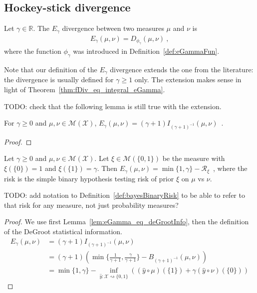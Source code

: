 \subsection{Hockey-stick divergence}

\begin{definition}
  \label{def:eGamma}
  Let $\gamma \in \mathbb{R}$. The $E_\gamma$ divergence between two measures $\mu$ and $\nu$ is
  \begin{align*}
  E_\gamma(\mu, \nu) = D_{\phi_\gamma}(\mu, \nu) \: ,
  \end{align*}
  where the function $\phi_\gamma$ was introduced in Definition~\ref{def:eGammaFun}.
\end{definition}

Note that our definition of the $E_\gamma$ divergence extends the one from the literature: the divergence is usually defined for $\gamma \ge 1$ only.
The extension makes sense in light of Theorem~\ref{thm:fDiv_eq_integral_eGamma}.

TODO: check that the following lemma is still true with the extension.

\begin{lemma}
  \label{lem:eGamma_eq_deGrootInfo}
  For $\gamma \ge 0$ and $\mu, \nu \in \mathcal M(\mathcal X)$, $E_\gamma(\mu, \nu) = (\gamma + 1) I_{(\gamma + 1)^{-1}}(\mu, \nu)$~.
\end{lemma}

\begin{proof}%
\uses{}

\end{proof}

\begin{lemma}
  \label{lem:eGamma_eq_sub_bayesBinaryRisk}
  Let $\gamma \ge 0$ and $\mu, \nu \in \mathcal M(\mathcal X)$. Let $\xi \in \mathcal M(\{0,1\})$ be the measure with $\xi(\{0\})=1$ and $\xi(\{1\}) = \gamma$. Then
  $E_\gamma(\mu, \nu) = \min\{1, \gamma\} - \mathcal R_\xi$~, where the risk is the simple binary hypothesis testing risk of prior $\xi$ on $\mu$ vs $\nu$.
\end{lemma}

TODO: add notation to Definition~\ref{def:bayesBinaryRisk} to be able to refer to that risk for any measure, not just probability measures?

\begin{proof}%
{}
We use first Lemma~\ref{lem:eGamma_eq_deGrootInfo}, then the definition of the DeGroot statistical information.
\begin{align*}
E_\gamma(\mu, \nu)
&= (\gamma + 1) I_{(\gamma + 1)^{-1}}(\mu, \nu)
\\
&= (\gamma + 1) \left( \min\{\frac{1}{\gamma + 1}, \frac{\gamma}{\gamma + 1}\} - B_{(\gamma + 1)^{-1}}(\mu, \nu) \right)
\\
&= \min\{1, \gamma\} - \inf_{\hat{y} : \mathcal X \rightsquigarrow \{0,1\}}\left((\hat{y} \circ \mu)(\{1\}) + \gamma (\hat{y} \circ \nu)(\{0\})\right)
\end{align*}

\end{proof}
